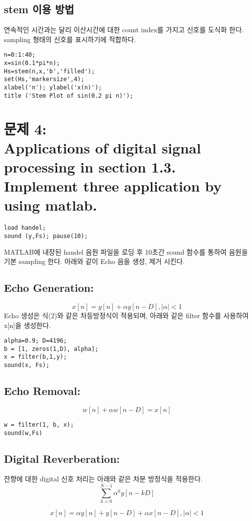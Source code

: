 \documentclass[11pt
  , a4paper
  , article
  , oneside
]{memoir}
\begin{document}
\section{stem 이용 방법}
연속적인 시간과는 달리 이산시간에 대한 count index를 가지고 신호를 도식화 한다. sampling 형태의 신호를 표시하기에 적합하다.
\begin{lstlisting}[style=termstyle]
n=0:1:40;
x=sin(0.1*pi*n);
Hs=stem(n,x,'b','filled');
set(Hs,'markersize',4);
xlabel('n'); ylabel('x(n)');
title ('Stem Plot of sin(0.2 pi n)');
\end{lstlisting}

\clearpage

\chapter{문제 4: \\Applications of digital signal processing in section 1.3. Implement three application by using matlab. }
\begin{lstlisting}[style=termstyle]
load handel;
sound (y,Fs); pause(10);
\end{lstlisting}
MATLAB에 내장된 handel 음원 파일을 로딩 후 10초간 sound 함수를 통하여 음원을 기본 sampling 한다.
아래와 같이 Echo 음을 생성, 제거 시킨다.

\hfill\break

\section{Echo Generation: }
\begin {equation}
x[n] = y[n] + \alpha y[n-D], \mid \alpha \mid < 1
\end {equation}
Echo 생성은 식(2)와 같은 차등방정식이 적용되며, 아래와 같은 filter 함수를 사용하여 x[n]을 생성한다.

\begin{lstlisting}[style=termstyle]
alpha=0.9; D=4196;
b = [1, zeros(1,D), alpha];
x = filter(b,1,y);
sound(x, Fs);
\end{lstlisting}

\section{Echo Removal: }

\begin {equation}
w[n] + \alpha w[n-D] = x[n]
\end {equation}

\begin{lstlisting}[style=termstyle]
w = filter(1, b, x);
sound(w,Fs)
\end{lstlisting}

\section{Digital Reverberation: }
잔향에 대한 digital 신호 처리는 아래와 같은 차분 방정식을 적용한다.
\begin {equation}
\displaystyle\sum_{k=0}^{N-1} \alpha^k y[n-kD]
\end {equation}

\begin {equation}
x[n] = \alpha y[n] + y[n-D] + \alpha x[n-D], \mid \alpha \mid < 1
\end {equation}
\end{document}
